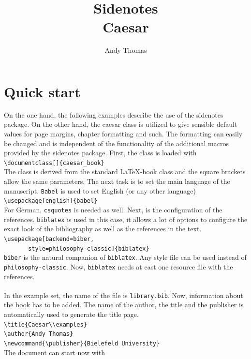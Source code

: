 \documentclass{caesar_book}
\title{Sidenotes\\Caesar}
\author{Andy Thomas}
\newcommand{\publisher}{Bielefeld University}
\begin{document}
\frontmatter
\maketitlepage
\tableofcontents
\mainmatter
\chapter{Quick start}
On the one hand, the following examples describe the use of the sidenotes package. On the other hand, the caesar class is utilized to give sensible default values for page margins, chapter formatting and such. The formatting can easily be changed and is independent of the functionality of the additional macros provided by the sidenotes package. First, the class is loaded with\\
\verb+\documentclass[]{caesar_book}+\\
The class is derived from the standard \LaTeX-book class and the square brackets allow the same parameters. The next task is to set the main language of the manuscript. \texttt{Babel} is used to set English (or any other language)\\
\verb+\usepackage[english]{babel}+\\
For German, \texttt{csquotes} is needed as well. Next, is the configuration of the references. \texttt{biblatex} is used in this case, it allows a lot of options to configure the exact look of the bibliography as well as the references in the text.\\
\verb+\usepackage[backend=biber,+\\
\verb+       style=philosophy-classic]{biblatex}+\\
\texttt{biber} is the natural companion of \texttt{biblatex}. Any style file can be used instead of \texttt{philosophy-classic}. Now, \texttt{biblatex} needs at east one resource file with the references.\\
\verb++\\
In the example set, the name of the file is \texttt{library.bib}. Now, information about the book has to be added. The name of the author, the title and the publisher is automatically used to generate the title page.\\
\verb+\title{Caesar\\examples}+\\
\verb+\author{Andy Thomas}+\\
\verb+\newcommand{\publisher}{Bielefeld University}+\\
The document can start now with\\
\end{document}
